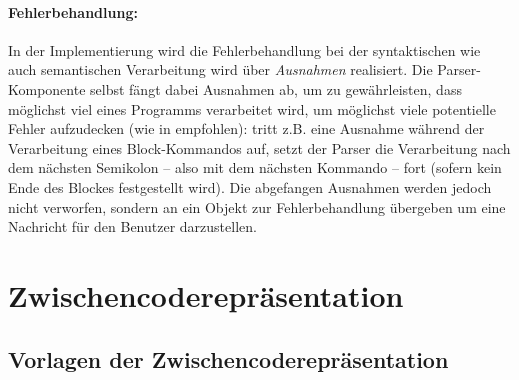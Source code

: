 \documentclass[twoside,a4paper,fleqn,12pt]{book}
\begin{document}
%   

\paragraph{Fehlerbehandlung:}
In der Implementierung wird die Fehlerbehandlung bei der syntaktischen wie auch semantischen Verarbeitung wird über \emph{Ausnahmen}
realisiert. Die Parser-Komponente selbst fängt dabei Ausnahmen ab, um zu gewährleisten, dass möglichst viel eines
Programms verarbeitet wird, um möglichst viele potentielle Fehler aufzudecken (wie in \cite{wirth_compiler} empfohlen):
tritt z.B. eine Ausnahme während der Verarbeitung eines Block-Kommandos auf, setzt der Parser die
Verarbeitung nach dem nächsten Semikolon -- also mit dem nächsten Kommando -- fort (sofern kein Ende
des Blockes festgestellt wird).
Die abgefangen Ausnahmen werden jedoch nicht verworfen, sondern an ein Objekt zur Fehlerbehandlung
übergeben um eine Nachricht für den Benutzer darzustellen.



\section{Zwischencoderepräsentation}
\label{zcr}




\subsection{Vorlagen der Zwischencoderepräsentation}
\end{document}
